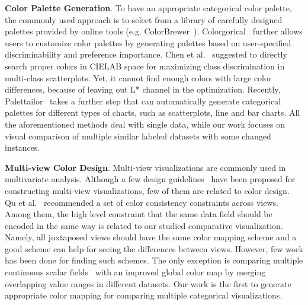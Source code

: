 \vspace{1.5mm}
\noindent\textbf{Color Palette Generation}.
To have an appropriate categorical color palette, the commonly used approach is to select from
a library of carefully designed palettes provided by online tools (e.g. ColorBrewer~\cite{harrower2003colorbrewer}).
Colorgorical~\cite{Gramazio17} further allows users to customize color palettes by generating palettes based on user-specified discriminability and preference importance.
Chen et al.~\cite{Chen14}  suggested to directly search proper colors in CIELAB space for maximizing class discrimination in multi-class scatterplots. Yet, it cannot find enough colors with large color differences, because of leaving out L* channel in the optimization.
Recently, Palettailor~\cite{Lu21} takes a further step that can automatically generate categorical palettes for different types of charts, such as scatterplots,  line and bar charts.
All the aforementioned methods deal with single data, while our work focuses on visual comparison of multiple similar labeled datasets with some changed instances.

\vspace{1.5mm}
\noindent\textbf{Multi-view Color Design}.
Multi-view visualizations are commonly used in multivariate analysis. Although a few design guidelines~\cite{wang2000guidelines} have been proposed for constructing multi-view visualizations, few of them are related to color design. Qu et al.~\cite{qu2017keeping} recommended a set of color consistency constraints across views.
Among them, the high level constraint that the same data field should be encoded in the same way is related to our studied comparative visualization. Namely, all juxtaposed views should have the same color mapping scheme and a good scheme can help for seeing the differences between views.
However, few work has been done for finding such schemes. The only exception is comparing multiple continuous scalar fields~\cite{Tominski08} with an improved global color map by merging overlapping value ranges in different datasets. Our work is the first to generate appropriate color mapping for comparing multiple categorical visualizations.



